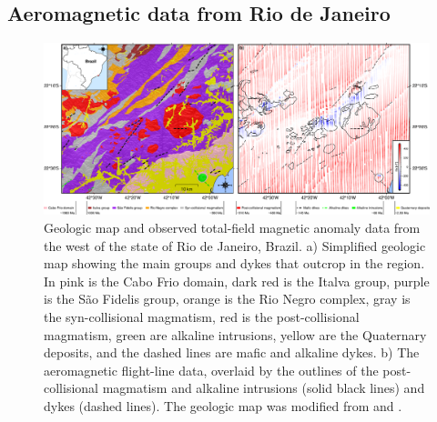 \subsection{Aeromagnetic data from Rio de Janeiro}
\label{sec:rio}

\begin{figure}[tb!]
\centering
\includegraphics[width=1\linewidth]{figures/real-data-geology.png}
\caption{
  Geologic map and observed total-field magnetic anomaly data from the west of
  the state of Rio de Janeiro, Brazil.
  a) Simplified geologic map showing the main groups and dykes that outcrop in
  the region.
  In pink is the Cabo Frio domain, dark red is the Italva group, purple is the
  São Fidelis group, orange is the Rio Negro complex, gray is the
  syn-collisional magmatism, red is the post-collisional magmatism, green are
  alkaline intrusions, yellow are the Quaternary deposits, and the dashed lines
  are mafic and alkaline dykes.
  b) The aeromagnetic flight-line data, overlaid by the outlines of the
  post-collisional magmatism and alkaline intrusions (solid black lines) and
  dykes (dashed lines).
  The geologic map was modified from \citet{Heilbron2016} and
  \citet{Dantas2017}.
}
\label{fig:rio_context}
\end{figure}

